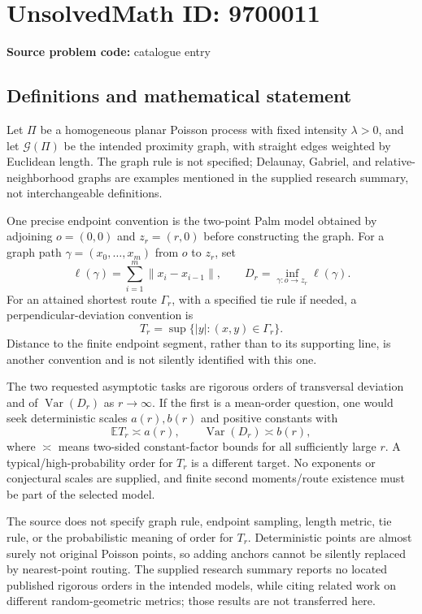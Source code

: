 \documentclass[11pt]{article}
\begin{document}
\section*{UnsolvedMath ID: 9700011}
\textbf{Source problem code:} catalogue entry
\subsection{Definitions and mathematical statement}
Let \(\Pi\) be a homogeneous planar Poisson process with fixed intensity \(\lambda>0\), and let \(\mathcal G(\Pi)\) be the intended proximity graph, with straight edges weighted by Euclidean length. The graph rule is not specified; Delaunay, Gabriel, and relative-neighborhood graphs are examples mentioned in the supplied research summary, not interchangeable definitions.

One precise endpoint convention is the two-point Palm model obtained by adjoining \(o=(0,0)\) and \(z_r=(r,0)\) before constructing the graph. For a graph path \(\gamma=(x_0,\ldots,x_m)\) from \(o\) to \(z_r\), set
\[
\ell(\gamma)=\sum_{i=1}^m\|x_i-x_{i-1}\|,
\qquad D_r=\inf_{\gamma:o\to z_r}\ell(\gamma).
\]
For an attained shortest route \(\Gamma_r\), with a specified tie rule if needed, a perpendicular-deviation convention is
\[
T_r=\sup\{|y|:(x,y)\in\Gamma_r\}.
\]
Distance to the finite endpoint segment, rather than to its supporting line, is another convention and is not silently identified with this one.

The two requested asymptotic tasks are rigorous orders of transversal deviation and of \(\operatorname{Var}(D_r)\) as \(r\to\infty\). If the first is a mean-order question, one would seek deterministic scales \(a(r),b(r)\) and positive constants with
\[
\mathbb E T_r\asymp a(r),\qquad\operatorname{Var}(D_r)\asymp b(r),
\]
where \(\asymp\) means two-sided constant-factor bounds for all sufficiently large \(r\). A typical/high-probability order for \(T_r\) is a different target. No exponents or conjectural scales are supplied, and finite second moments/route existence must be part of the selected model.

The source does not specify graph rule, endpoint sampling, length metric, tie rule, or the probabilistic meaning of order for \(T_r\). Deterministic points are almost surely not original Poisson points, so adding anchors cannot be silently replaced by nearest-point routing. The supplied research summary reports no located published rigorous orders in the intended models, while citing related work on different random-geometric metrics; those results are not transferred here.
\end{document}
